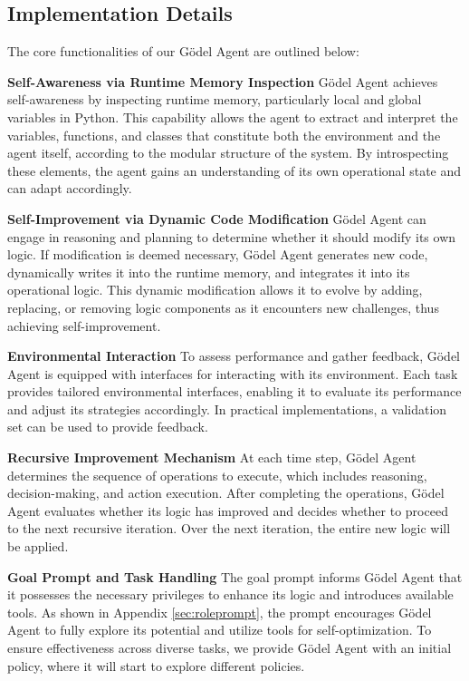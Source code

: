 \documentclass[11pt]{article}
\newcommand{\framework}{Gödel Agent\xspace}
\begin{document}
\subsection{Implementation Details}
The core functionalities of our \framework are outlined below:

\noindent\textbf{Self-Awareness via Runtime Memory Inspection} \quad
\framework achieves self-awareness by inspecting runtime memory, particularly local and global variables in Python. This capability allows the agent to extract and interpret the variables, functions, and classes that constitute both the environment and the agent itself, according to the modular structure of the system. By introspecting these elements, the agent gains an understanding of its own operational state and can adapt accordingly.

\noindent\textbf{Self-Improvement via Dynamic Code Modification} \quad
\framework can engage in reasoning and planning to determine whether it should modify its own logic. If modification is deemed necessary, \framework generates new code, dynamically writes it into the runtime memory, and integrates it into its operational logic. This dynamic modification allows it to evolve by adding, replacing, or removing logic components as it encounters new challenges, thus achieving self-improvement.

\noindent\textbf{Environmental Interaction} \quad
To assess performance and gather feedback, \framework is equipped with interfaces for interacting with its environment. Each task provides tailored environmental interfaces, enabling it to evaluate its performance and adjust its strategies accordingly. 
In practical implementations, a validation set can be used to provide feedback.

\noindent\textbf{Recursive Improvement Mechanism} \quad
At each time step, \framework determines the sequence of operations to execute, which includes reasoning, decision-making, and action execution. After completing the operations, \framework evaluates whether its logic has improved and decides whether to proceed to the next recursive iteration. 
Over the next iteration, the entire new logic will be applied.

\noindent\textbf{Goal Prompt and Task Handling} \quad
The goal prompt informs \framework that it possesses the necessary privileges to enhance its logic and introduces available tools. As shown in Appendix \ref{sec:roleprompt}, the prompt encourages \framework to fully explore its potential and utilize tools for self-optimization. To ensure effectiveness across diverse tasks, we provide \framework with an initial policy, where it will start to explore different policies.
\end{document}
